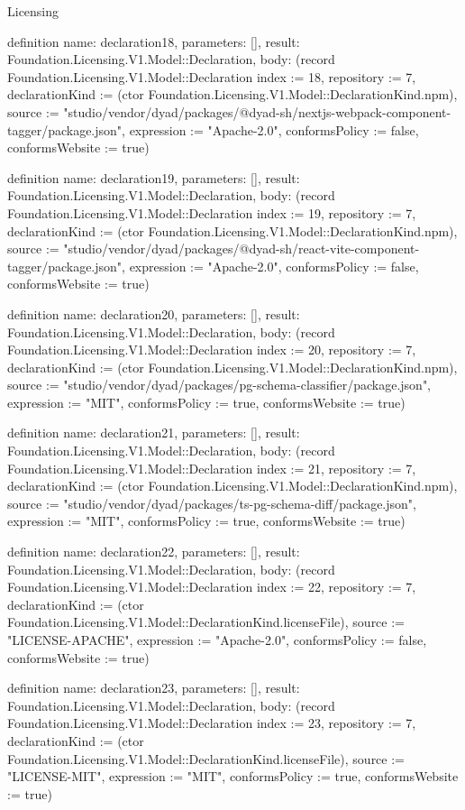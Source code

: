 \begin{lexlean}{Licensing}
\begin{semanticmodule}
definition{
  name: declaration18,
  parameters: [],
  result: Foundation.Licensing.V1.Model::Declaration,
  body: (record Foundation.Licensing.V1.Model::Declaration {index := 18, repository := 7, declarationKind := (ctor Foundation.Licensing.V1.Model::DeclarationKind.npm), source := "studio/vendor/dyad/packages/@dyad-sh/nextjs-webpack-component-tagger/package.json", expression := "Apache-2.0", conformsPolicy := false, conformsWebsite := true})
}

definition{
  name: declaration19,
  parameters: [],
  result: Foundation.Licensing.V1.Model::Declaration,
  body: (record Foundation.Licensing.V1.Model::Declaration {index := 19, repository := 7, declarationKind := (ctor Foundation.Licensing.V1.Model::DeclarationKind.npm), source := "studio/vendor/dyad/packages/@dyad-sh/react-vite-component-tagger/package.json", expression := "Apache-2.0", conformsPolicy := false, conformsWebsite := true})
}

definition{
  name: declaration20,
  parameters: [],
  result: Foundation.Licensing.V1.Model::Declaration,
  body: (record Foundation.Licensing.V1.Model::Declaration {index := 20, repository := 7, declarationKind := (ctor Foundation.Licensing.V1.Model::DeclarationKind.npm), source := "studio/vendor/dyad/packages/pg-schema-classifier/package.json", expression := "MIT", conformsPolicy := true, conformsWebsite := true})
}

definition{
  name: declaration21,
  parameters: [],
  result: Foundation.Licensing.V1.Model::Declaration,
  body: (record Foundation.Licensing.V1.Model::Declaration {index := 21, repository := 7, declarationKind := (ctor Foundation.Licensing.V1.Model::DeclarationKind.npm), source := "studio/vendor/dyad/packages/ts-pg-schema-diff/package.json", expression := "MIT", conformsPolicy := true, conformsWebsite := true})
}

definition{
  name: declaration22,
  parameters: [],
  result: Foundation.Licensing.V1.Model::Declaration,
  body: (record Foundation.Licensing.V1.Model::Declaration {index := 22, repository := 7, declarationKind := (ctor Foundation.Licensing.V1.Model::DeclarationKind.licenseFile), source := "LICENSE-APACHE", expression := "Apache-2.0", conformsPolicy := false, conformsWebsite := true})
}

definition{
  name: declaration23,
  parameters: [],
  result: Foundation.Licensing.V1.Model::Declaration,
  body: (record Foundation.Licensing.V1.Model::Declaration {index := 23, repository := 7, declarationKind := (ctor Foundation.Licensing.V1.Model::DeclarationKind.licenseFile), source := "LICENSE-MIT", expression := "MIT", conformsPolicy := true, conformsWebsite := true})
}


\end{semanticmodule}
\end{lexlean}
